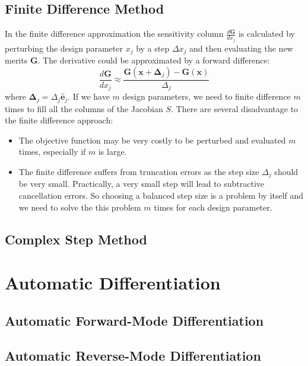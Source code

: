 \documentclass{tufte-handout}
\begin{document}
\subsection{Finite Difference Method}
In the finite difference approximation the sensitivity column $\frac{d \mathbf{G}}{dx_j}$  is calculated by perturbing the design parameter $x_j$  by a step $\Delta x_j$ and then evaluating the new merits $\mathbf{G}$. The derivative could be approximated by a  forward difference:
\begin{equation}
\frac{d \mathbf{G}}{dx_j} \approx  \frac{\mathbf{G}(\mathbf{x} + \mathbf{\Delta}_j) - \mathbf{G}(\mathbf{x})}{\Delta_j}
\end{equation}
where $\mathbf{\Delta}_j = \Delta_j {\mathbf{\hat{e}}_j}$.
If we have $m$ design parameters, we need to finite difference $m$ times to fill all the columns of the Jacobian $S$. There are several disadvantage to the finite difference approach: 
\begin{itemize}
	\item The objective function  may be very costly to be perturbed and evaluated $m$ times, especially if $m$ is large.
	\item The finite difference suffers from truncation errors as the step size $\Delta_j$  should be very  small. Practically, a very small step will lead to subtractive cancellation errors. So choosing a balanced step size is a problem by itself and we need to solve the this problem $m$ times for each design parameter. 
\end{itemize}

\subsection{Complex Step Method}
\section{Automatic Differentiation}

\subsection{Automatic Forward-Mode Differentiation}
\subsection{Automatic Reverse-Mode Differentiation}
\end{document}
